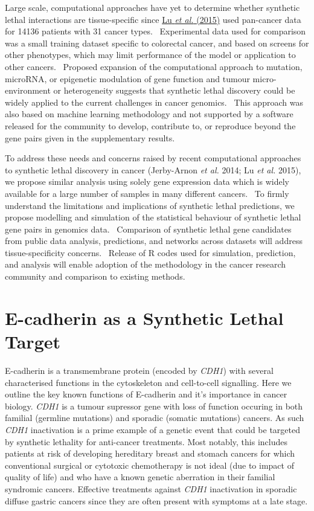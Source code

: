 Large scale, computational approaches have yet to determine whether synthetic lethal interactions are tissue-specific since \hyperlink{ENREF74}{Lu}\hyperlink{ENREF74}{\textit{ et al.}}\hyperlink{ENREF74}{ (2015)} used pan-cancer data for 14136 patients with 31 cancer types. \ Experimental data used for comparison was a small training dataset specific to colorectal cancer, and based on screens for other phenotypes, which may limit performance of the model or application to other cancers. \ Proposed expansion of the computational approach to mutation, microRNA, or epigenetic modulation of gene function and tumour micro-environment or heterogeneity suggests that synthetic lethal discovery could be widely applied to the current challenges in cancer genomics. \ This approach was also based on machine learning methodology and not supported by a software released for the community to develop, contribute to, or reproduce beyond the gene pairs given in the supplementary results. 

To address these needs and concerns raised by recent computational approaches to synthetic lethal discovery in cancer (Jerby-Arnon\textit{ et al.} 2014; Lu\textit{ et al.} 2015), we propose similar analysis using solely gene expression data which is widely available for a large number of samples in many different cancers. \ To firmly understand the limitations and implications of synthetic lethal predictions, we propose modelling and simulation of the statistical behaviour of synthetic lethal gene pairs in genomics data. \ Comparison of synthetic lethal gene candidates from public data analysis, predictions, and networks across datasets will address tissue-specificity concerns. \ Release of R codes used for simulation, prediction, and analysis will enable adoption of the methodology in the cancer research community and comparison to existing methods. 


\section{E-cadherin as a Synthetic Lethal Target}

E-cadherin is a transmembrane protein (encoded by \textit{CDH1}) with several characterised functions in the cytoskeleton and cell-to-cell signalling. Here we outline the key known functions of E-cadherin and it's importance in cancer biology. \textit{CDH1} is a tumour supressor gene with loss of function occuring in both familial (germline mutations) and sporadic (somatic mutations) cancers. As such \textit{CDH1} inactivation is a prime example of a genetic event that could be targeted by synthetic lethality for anti-cancer treatments. Most notably, this includes patients at risk of developing hereditary breast and stomach cancers for which conventional surgical or cytotoxic chemotherapy is not ideal (due to impact of quality of life) and who have a known genetic aberration in their familial syndromic cancers. Effective treatments against \textit{CDH1} inactivation in sporadic diffuse gastric cancers since they are often present with symptoms at a late stage.

